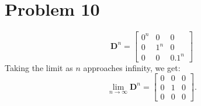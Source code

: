 \documentclass[12pt,a4paper]{article}
\begin{document}
\section*{Problem 10}
\begin{solution}

    $$
    \mathbf{D}^n = 
    \begin{bmatrix}
        0^n & 0 & 0\\
        0 & 1^n & 0\\
        0 & 0 & 0.1^n
    \end{bmatrix}
    $$
    Taking the limit as $n$ approaches infinity, we get:
    $$
    \lim_{n \to \infty} \mathbf{D}^n = 
    \begin{bmatrix}
        0 & 0 & 0\\
        0 & 1 & 0\\
        0 & 0 & 0
    \end{bmatrix}.
    $$


\end{solution}
\end{document}
